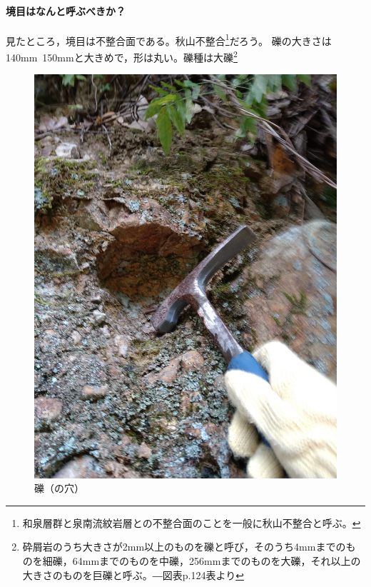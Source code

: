 \documentclass[uplatex,b5paper]{jsreport}
\begin{document}
      \paragraph{境目はなんと呼ぶべきか？}
      見たところ，境目は不整合面である。秋山不整合\footnote{和泉層群と泉南流紋岩層との不整合面のことを一般に秋山不整合と呼ぶ。}だろう。
      礫の大きさは140mm~150mmと大きめで，形は丸い。礫種は大礫\footnote{砕屑岩のうち大きさが2mm以上のものを礫と呼び，そのうち4mmまでのものを細礫，64mmまでのものを中礫，256mmまでのものを大礫，それ以上の大きさのものを巨礫と呼ぶ。―図表p.124表より}
      \begin{figure}[h]
        \begin{center}
          \includegraphics[scale=0.04]{files/地学実習/地点5_礫.jpg}
          \caption{礫（の穴）}
        \end{center}
      \end{figure}
\end{document}
